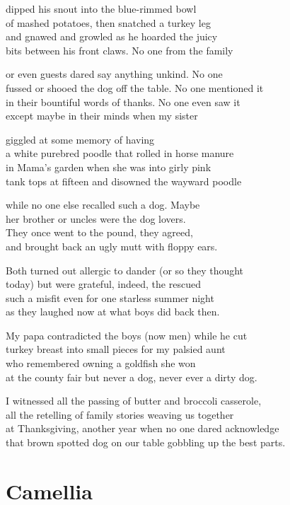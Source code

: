\documentclass[twoside,10pt]{book}
\begin{document}
dipped his snout into the blue-rimmed bowl\\
of mashed potatoes, then snatched a turkey leg\\
and gnawed and growled as he hoarded the juicy\\
bits between his front claws. No one from the family

or even guests dared say anything unkind. No one\\
fussed or shooed the dog off the table. No one mentioned it\\
in their bountiful words of thanks. No one even saw it\\
except maybe in their minds when my sister

giggled at some memory of having\\
a white purebred poodle that rolled in horse manure\\
in Mama's garden when she was into girly pink\\
tank tops at fifteen and disowned the wayward poodle

while no one else recalled such a dog. Maybe\\
her brother or uncles were the dog lovers.\\
They once went to the pound, they agreed,\\
and brought back an ugly mutt with floppy ears.

Both turned out allergic to dander (or so they thought\\
today) but were grateful, indeed, the rescued\\
such a misfit even for one starless summer night\\
as they laughed now at what boys did back then.

My papa contradicted the boys (now men) while he cut\\
turkey breast into small pieces for my palsied aunt\\
who remembered owning a goldfish she won\\
at the county fair but never a dog, never ever a dirty dog.

I witnessed all the passing of butter and broccoli casserole,\\
all the retelling of family stories weaving us together\\
at Thanksgiving, another year when no one dared acknowledge\\
that brown spotted dog on our table gobbling up the best parts.


\clearpage
\section{Camellia}
\end{document}
